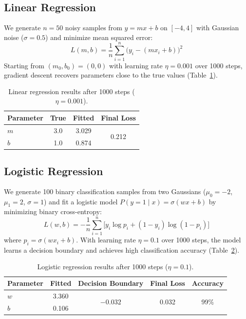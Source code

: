 \documentclass{article}
\begin{document}
\subsection{Linear Regression}

We generate $n = 50$ noisy samples from $y = mx + b$ on $[-4, 4]$ with Gaussian noise ($\sigma = 0.5$) and minimize mean squared error:
\[
L(m, b) = \frac{1}{n} \sum_{i=1}^{n} \bigl(y_i - (m x_i + b)\bigr)^2
\]
Starting from $(m_0, b_0) = (0, 0)$ with learning rate $\eta = 0.001$ over 1000 steps, gradient descent recovers parameters close to the true values (Table~\ref{tab:linear}).

\begin{table}[ht]
\centering
\begin{tabular}{lccc}
\hline
\textbf{Parameter} & \textbf{True} & \textbf{Fitted} & \textbf{Final Loss} \\
\hline
$m$ & 3.0 & 3.029 & \multirow{2}{*}{0.212} \\
$b$ & 1.0 & 0.874 & \\
\hline
\end{tabular}
\caption{Linear regression results after 1000 steps ($\eta = 0.001$).}
\label{tab:linear}
\end{table}

\subsection{Logistic Regression}

We generate 100 binary classification samples from two Gaussians ($\mu_0 = -2$, $\mu_1 = 2$, $\sigma = 1$) and fit a logistic model $P(y=1 \mid x) = \sigma(wx + b)$ by minimizing binary cross-entropy:
\[
L(w, b) = -\frac{1}{n} \sum_{i=1}^{n} \bigl[ y_i \log p_i + (1 - y_i) \log(1 - p_i) \bigr]
\]
where $p_i = \sigma(w x_i + b)$. With learning rate $\eta = 0.1$ over 1000 steps, the model learns a decision boundary and achieves high classification accuracy (Table~\ref{tab:logistic}).

\begin{table}[ht]
\centering
\begin{tabular}{lcccc}
\hline
\textbf{Parameter} & \textbf{Fitted} & \textbf{Decision Boundary} & \textbf{Final Loss} & \textbf{Accuracy} \\
\hline
$w$ & 3.360 & \multirow{2}{*}{$-0.032$} & \multirow{2}{*}{0.032} & \multirow{2}{*}{99\%} \\
$b$ & 0.106 & & & \\
\hline
\end{tabular}
\caption{Logistic regression results after 1000 steps ($\eta = 0.1$).}
\label{tab:logistic}
\end{table}
\end{document}
